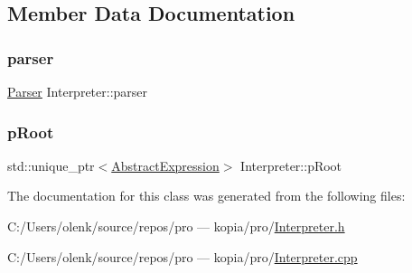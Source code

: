\subsection{Member Data Documentation}
\mbox{\label{class_interpreter_a1c142e9f2068dabdbeb1b93e1d2cd3be}} 
\subsubsection{\texorpdfstring{parser}{parser}}
{\footnotesize\ttfamily \mbox{\hyperlink{class_parser}{Parser}} Interpreter\+::parser\hspace{0.3cm}{\ttfamily [protected]}}

\mbox{\label{class_interpreter_af780f2e13f0ee870ce36c7cfe4a0a286}} 
\subsubsection{\texorpdfstring{pRoot}{pRoot}}
{\footnotesize\ttfamily std\+::unique\+\_\+ptr$<$\mbox{\hyperlink{class_abstract_expression}{Abstract\+Expression}}$>$ Interpreter\+::p\+Root\hspace{0.3cm}{\ttfamily [protected]}}



The documentation for this class was generated from the following files\+:\begin{DoxyCompactItemize}
\item 
C\+:/\+Users/olenk/source/repos/pro — kopia/pro/\mbox{\hyperlink{_interpreter_8h}{Interpreter.\+h}}\item 
C\+:/\+Users/olenk/source/repos/pro — kopia/pro/\mbox{\hyperlink{_interpreter_8cpp}{Interpreter.\+cpp}}\end{DoxyCompactItemize}
